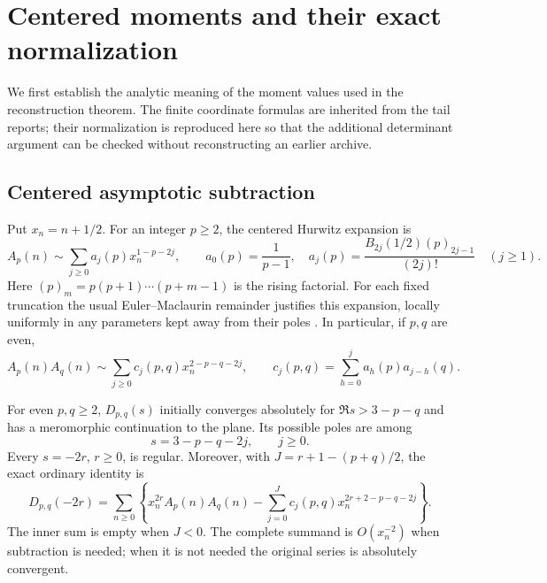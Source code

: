 \section{Centered moments and their exact normalization}
\label{sec:foundation}

We first establish the analytic meaning of the moment values used in
the reconstruction theorem. The finite coordinate formulas are
inherited from the tail reports; their normalization is reproduced
here so that the additional determinant argument can be checked
without reconstructing an earlier archive.

\subsection{Centered asymptotic subtraction}

Put $x_n=n+1/2$. For an integer $p\ge2$, the centered Hurwitz
expansion is
\begin{equation}\label{found:asymptotic}
 A_p(n)\sim\sum_{j\ge0}a_j(p)x_n^{1-p-2j},\qquad
 a_0(p)=\frac1{p-1},\quad
 a_j(p)=\frac{B_{2j}(1/2)(p)_{2j-1}}{(2j)!}\quad(j\ge1).
\end{equation}
Here $(p)_m=p(p+1)\cdots(p+m-1)$ is the rising factorial.
For each fixed truncation the usual Euler--Maclaurin remainder
justifies this expansion, locally uniformly in any parameters kept
away from their poles \cite{DLMF}. In particular, if $p,q$ are even,
\begin{equation}\label{found:product-expansion}
 A_p(n)A_q(n)\sim
 \sum_{j\ge0}c_j(p,q)x_n^{2-p-q-2j},\qquad
 c_j(p,q)=\sum_{h=0}^j a_h(p)a_{j-h}(q).
\end{equation}

\begin{proposition}
\label{found:regularity}
For even $p,q\ge2$, $D_{p,q}(s)$ initially converges absolutely for
$\Re s>3-p-q$ and has a meromorphic continuation to the plane.
Its possible poles are among
\[
                         s=3-p-q-2j,\qquad j\ge0.
\]
Every $s=-2r$, $r\ge0$, is regular. Moreover, with
$J=r+1-(p+q)/2$, the exact ordinary identity is
\begin{equation}\label{found:ordinary}
 D_{p,q}(-2r)=\sum_{n\ge0}\left\{
 x_n^{2r}A_p(n)A_q(n)
 -\sum_{j=0}^{J}c_j(p,q)x_n^{2r+2-p-q-2j}\right\}.
\end{equation}
The inner sum is empty when $J<0$. The complete summand is
$O(x_n^{-2})$ when subtraction is needed; when it is not needed the
original series is absolutely convergent.
\end{proposition}

